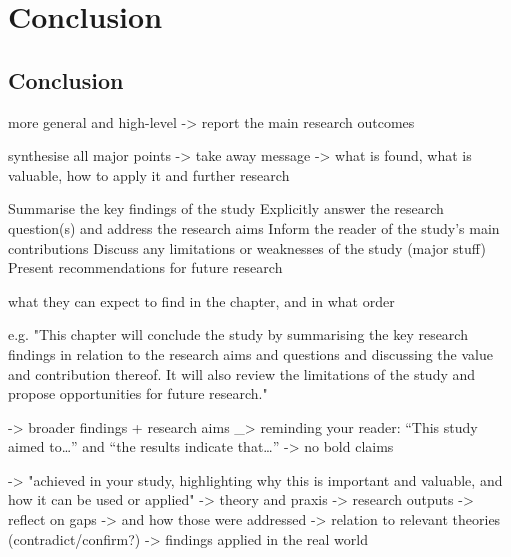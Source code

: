 
\chapter{Conclusion} %

\label{ChapterX} %


\section{Conclusion}

more general and high-level -> report the main research outcomes

synthesise all major points -> take away message
-> what is found, what is valuable, how to apply it and further research

Summarise the key findings of the study
Explicitly answer the research question(s) and address the research aims
Inform the reader of the study’s main contributions
Discuss any limitations or weaknesses of the study (major stuff)
Present recommendations for future research



what they can expect to find in the chapter, and in what order

e.g. "This chapter will conclude the study by summarising the key research findings in relation to the research aims and questions and discussing the value and contribution thereof. It will also review the limitations of the study and propose opportunities for future research."

-> broader findings + research aims
_> reminding your reader: “This study aimed to…” and “the results indicate that…”
-> no bold claims

-> "achieved in your study, highlighting why this is important and valuable, and how it can be used or applied"
-> theory and praxis
-> research outputs
-> reflect on gaps -> and how those were addressed
-> relation to relevant theories (contradict/confirm?)
-> findings applied in the real world

